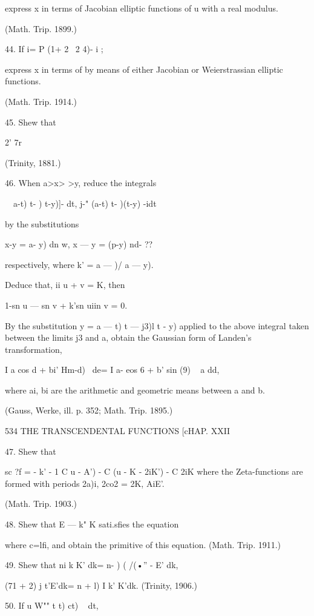 express x in terms of Jacobian elliptic functions of u with a real modulus. 

(Math. Trip. 1899.) 



44. If  i= P (1+ 2 \  2 4)- i ;  



express x in terms of   by means of either Jacobian or Weierstrassian elliptic functions. 

(Math. Trip. 1914.) 

45. Shew that 

2' 7r  

(Trinity, 1881.) 

46. When a>x>  >y, reduce the integrals 

\ \  a-t) t- ) t-y)]- dt, j-"  (a-t) t- )(t-y) -idt 

by the substitutions 

x-y =  a- y) dn  w, x — y = (p-y) nd- ?? 

respectively, where k'  =  a —  )/ a — y). 

Deduce that, ii u + v = K, then 

1-sn  u — sn  v + k'sn uiin v = 0. 

By the substitution y =  a — t)  t — j3)l t - y) applied to the above integral taken between 
the limits j3 and a, obtain the Gaussian form of Landen's transformation, 

I  a   cos  d + bi' Hm-d)~ de= I  a- eos  6 + b'  sin  (9) ~ a dd, 

where ai, bi are the arithmetic and geometric means between a and b. 

(Gauss, Werke, ill. p. 352; Math. Trip. 1895.) 



534 THE TRANSCENDENTAL FUNCTIONS [cHAP. XXII 

47. Shew that 

sc ?f = - k' - 1  C  u - A') - C (u - K - 2iK') - C  2iK%
where the Zeta-functions are formed with periods 2a)i, 2co2 = 2K, AiE'. 

(Math. Trip. 1903.) 

48. Shew that E — k" K sati.sfies the equation 

where c=lfi, and obtain the primitive of this equation. (Math. Trip. 1911.) 

49. Shew that ni  k  K' dk= n- )  (  /(•'' -   E' dk, 

(71 + 2) j t'E'dk= n + l) I k' K'dk. (Trinity, 1906.) 

50. If u W""  t  t)  ct) ~ dt, 

